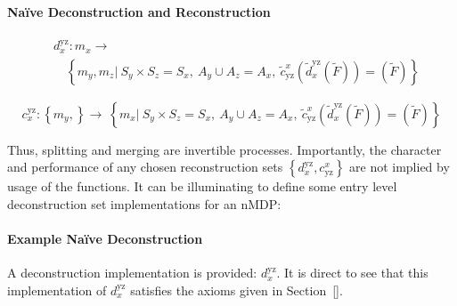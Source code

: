 \documentclass[compsoc,journal,letterpaper,10pt,draftcls,twocolumn]{IEEEtran}
\begin{document}
\paragraph{Na\"{i}ve Deconstruction and
Reconstruction}\label{nauxefve-deconstruction-and-reconstruction}
 
\begin{align}
& d_{x}^{\text{yz}}:m_{x} \rightarrow \nonumber \\
&\quad  \left\{ m_{y},m_{z}|\ S_{y} \times S_{z} = S_{x},\ A_{y} \cup A_{z} = A_{x},\ {\tilde{c}}_{\text{yz}}^{x}\left( {\tilde{d}}_{x}^{\text{yz}}\left( \tilde{F} \right) \right) = \left( \tilde{F} \right) \right\} 
\end{align}

\begin{equation}
c_{x}^{\text{yz}}:\left\{ m_{y}, \right\} \rightarrow \ \left\{ m_{x}|\ S_{y} \times S_{z} = S_{x},\ A_{y} \cup A_{z} = A_{x},\ {\tilde{c}}_{\text{yz}}^{x}\left( {\tilde{d}}_{x}^{\text{yz}}\left( \tilde{F} \right) \right) = \left( \tilde{F} \right) \right\} 
\end{equation}

Thus, splitting and merging are invertible processes. Importantly, the
character and performance of any chosen reconstruction sets
\(\left\{ d_{x}^{\text{yz}},c_{\text{yz}}^{x} \right\}\) are not implied
by usage of the functions. It can be illuminating to define some entry
level deconstruction set implementations for an nMDP:

\paragraph{Example Na\"{i}ve
Deconstruction}\label{example-nauxefve-deconstruction}

A deconstruction implementation is provided: \(d_{x}^{\text{yz}}\). It
is direct to see that this implementation of \(d_{x}^{\text{yz}}\)
satisfies the axioms given in Section~\ref{}.
\end{document}
